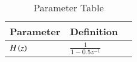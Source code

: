 \begin{table}[h]
\begin{tabular}{|l|l|l|}
\hline
\textbf{Parameter} & \textbf{Definition}\\ \hline
$H\left(z\right)$ & $\frac{1}{1-0.5z^{-1}}$ \\ \hline
\end{tabular}
\caption{Parameter Table}
\label{tab:gate.bm.31.2021}
\end{table}
